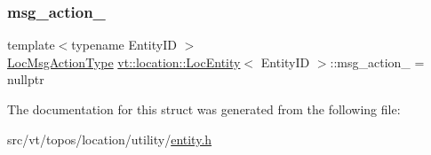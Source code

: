 \subsubsection{\texorpdfstring{msg\+\_\+action\+\_\+}{msg\_action\_}}
{\footnotesize\ttfamily template$<$typename Entity\+ID $>$ \\
\hyperlink{namespacevt_1_1location_ad0a130e4d79e745543925240e13e8f08}{Loc\+Msg\+Action\+Type} \hyperlink{structvt_1_1location_1_1_loc_entity}{vt\+::location\+::\+Loc\+Entity}$<$ Entity\+ID $>$\+::msg\+\_\+action\+\_\+ = nullptr\hspace{0.3cm}{\ttfamily [private]}}



The documentation for this struct was generated from the following file\+:\begin{DoxyCompactItemize}
\item 
src/vt/topos/location/utility/\hyperlink{entity_8h}{entity.\+h}\end{DoxyCompactItemize}
